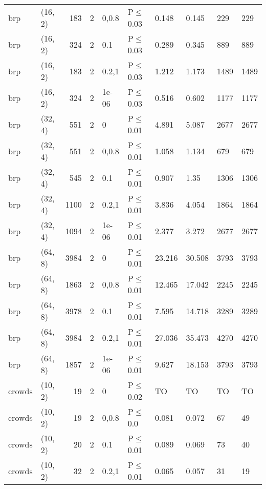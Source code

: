 \begin{longtable}{llrrllllll}
 brp           & (16, 2)   &    	183 &   2 & 0,0.8 & P$\leq$0.03  & 0.148   & 0.145   & 229     & 229  \\
 brp           & (16, 2)   &    	324 &   2 & 0.1   & P$\leq$0.03  & 0.289   & 0.345   & 889     & 889  \\
 brp           & (16, 2)   &    	183 &   2 & 0.2,1 & P$\leq$0.03  & 1.212   & 1.173   & 1489    & 1489 \\
 brp           & (16, 2)   &    	324 &   2 & 1e-06 & P$\leq$0.03  & 0.516   & 0.602   & 1177    & 1177 \\
 brp           & (32, 4)   &    	551 &   2 & 0     & P$\leq$0.01  & 4.891   & 5.087   & 2677    & 2677 \\
 brp           & (32, 4)   &    	551 &   2 & 0,0.8 & P$\leq$0.01  & 1.058   & 1.134   & 679     & 679  \\
 brp           & (32, 4)   &    	545 &   2 & 0.1   & P$\leq$0.01  & 0.907   & 1.35    & 1306    & 1306 \\
 brp           & (32, 4)   &   	1100 &   2 & 0.2,1 & P$\leq$0.01  & 3.836   & 4.054   & 1864    & 1864 \\
 brp           & (32, 4)   &   	1094 &   2 & 1e-06 & P$\leq$0.01  & 2.377   & 3.272   & 2677    & 2677 \\
 brp           & (64, 8)   &   	3984 &   2 & 0     & P$\leq$0.01  & 23.216  & 30.508  & 3793    & 3793 \\
 brp           & (64, 8)   &   	1863 &   2 & 0,0.8 & P$\leq$0.01  & 12.465  & 17.042  & 2245    & 2245 \\
 brp           & (64, 8)   &   	3978 &   2 & 0.1   & P$\leq$0.01  & 7.595   & 14.718  & 3289    & 3289 \\
 brp           & (64, 8)   &   	3984 &   2 & 0.2,1 & P$\leq$0.01  & 27.036  & 35.473  & 4270    & 4270 \\
 brp           & (64, 8)   &   	1857 &   2 & 1e-06 & P$\leq$0.01  & 9.627   & 18.153  & 3793    & 3793 \\
 crowds        & (10, 2)   &     	19 &   2 & 0     & P$\leq$0.02  & TO      & TO      & TO      & TO   \\
 crowds        & (10, 2)   &     	19 &   2 & 0,0.8 & P$\leq$0.0   & 0.081   & 0.072   & 67      & 49   \\
 crowds        & (10, 2)   &     	20 &   2 & 0.1   & P$\leq$0.01  & 0.089   & 0.069   & 73      & 40   \\
 crowds        & (10, 2)   &     	32 &   2 & 0.2,1 & P$\leq$0.01  & 0.065   & 0.057   & 31      & 19   \\

\end{longtable}
